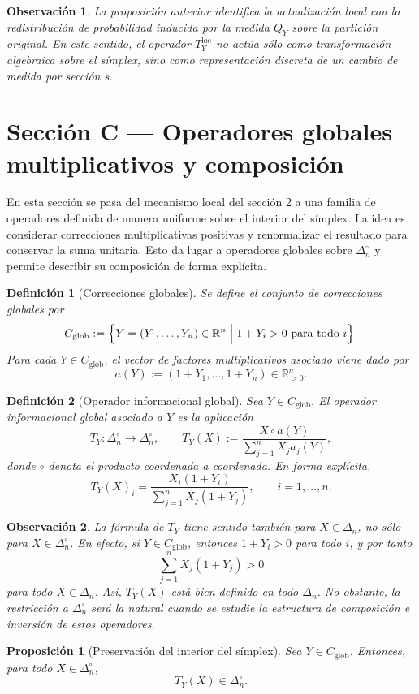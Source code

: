 ﻿\documentclass[12pt]{article}
\newtheorem{definicion}{Definición}[section]
\newtheorem{proposicion}{Proposición}[section]
\newtheorem{observacion}{Observación}[section]
\begin{document}
\begin{observacion}
La proposición anterior identifica la actualización local con la redistribución de probabilidad inducida por la medida $Q_Y$ sobre la partición original. En este sentido, el operador $T_Y^{\mathrm{loc}}$ no actúa sólo como transformación algebraica sobre el símplex, sino como representación discreta de un cambio de medida por sección s.
\end{observacion}
\section{Sección C — Operadores globales multiplicativos y composición}

En esta sección  se pasa del mecanismo local del sección 2 a una familia de operadores definida de manera uniforme sobre el interior del símplex. La idea es considerar correcciones multiplicativas positivas y renormalizar el resultado para conservar la suma unitaria. Esto da lugar a operadores globales sobre $\Delta_n^\circ$ y permite describir su composición de forma explícita.

\begin{definicion}[Correcciones globales]\label{def:Cglob}
Se define el conjunto de \emph{correcciones globales} por
\[
C_{\mathrm{glob}}
:=
\Bigl\{
Y=(Y_1,\dots,Y_n)\in\mathbb{R}^n
\;\Big|\;
1+Y_i>0 \ \text{para todo } i
\Bigr\}.
\]
Para cada $Y\in C_{\mathrm{glob}}$, el vector de factores multiplicativos asociado viene dado por
\[
a(Y):=(1+Y_1,\dots,1+Y_n)\in\mathbb{R}_{>0}^n.
\]
\end{definicion}

\begin{definicion}[Operador informacional global]\label{def:Tglobal}
Sea $Y\in C_{\mathrm{glob}}$. El \emph{operador informacional global} asociado a $Y$ es la aplicación
\[
T_Y:\Delta_n^\circ\to\Delta_n^\circ,
\qquad
T_Y(X)
:=
\frac{X\circ a(Y)}{\sum_{j=1}^n X_j a_j(Y)},
\]
donde $\circ$ denota el producto coordenada a coordenada. En forma explícita,
\[
T_Y(X)_i
=
\frac{X_i(1+Y_i)}{\sum_{j=1}^n X_j(1+Y_j)},
\qquad i=1,\dots,n.
\]
\end{definicion}

\begin{observacion}\label{obs:Tglobal-frontera}
La fórmula de $T_Y$ tiene sentido también para $X\in\Delta_n$, no sólo para $X\in\Delta_n^\circ$. En efecto, si $Y\in C_{\mathrm{glob}}$, entonces $1+Y_i>0$ para todo $i$, y por tanto
\[
\sum_{j=1}^n X_j(1+Y_j)>0
\]
para todo $X\in\Delta_n$. Así, $T_Y(X)$ está bien definido en todo $\Delta_n$. No obstante, la restricción a $\Delta_n^\circ$ será la natural cuando se estudie la estructura de composición e inversión de estos operadores.
\end{observacion}
\begin{proposicion}[Preservación del interior del símplex]\label{prop:interiorGlobal}
Sea $Y\in C_{\mathrm{glob}}$. Entonces, para todo $X\in\Delta_n^\circ$,
\[
T_Y(X)\in\Delta_n^\circ.
\]
\end{proposicion}
\end{document}
